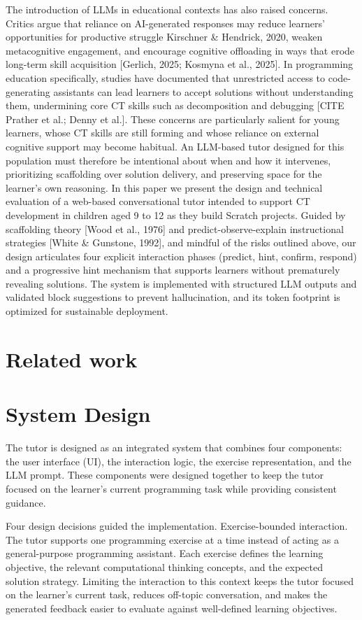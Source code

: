 \documentclass[conference]{IEEEtran}
\begin{document}
The introduction of LLMs in educational contexts has also raised concerns. Critics argue that reliance on AI-generated responses may reduce learners' opportunities for productive struggle Kirschner \& Hendrick, 2020, weaken metacognitive engagement, and encourage cognitive offloading in ways that erode long-term skill acquisition [Gerlich, 2025; Kosmyna et al., 2025]. In programming education specifically, studies have documented that unrestricted access to code-generating assistants can lead learners to accept solutions without understanding them, undermining core CT skills such as decomposition and debugging [CITE Prather et al.; Denny et al.]. These concerns are particularly salient for young learners, whose CT skills are still forming and whose reliance on external cognitive support may become habitual. An LLM-based tutor designed for this population must therefore be intentional about when and how it intervenes, prioritizing scaffolding over solution delivery, and preserving space for the learner's own reasoning.
In this paper we present the design and technical evaluation of a web-based conversational tutor intended to support CT development in children aged 9 to 12 as they build Scratch projects. Guided by scaffolding theory [Wood et al., 1976] and predict-observe-explain instructional strategies [White \& Gunstone, 1992], and mindful of the risks outlined above, our design articulates four explicit interaction phases (predict, hint, confirm, respond) and a progressive hint mechanism that supports learners without prematurely revealing solutions. The system is implemented with structured LLM outputs and validated block suggestions to prevent hallucination, and its token footprint is optimized for sustainable deployment.


\section{Related work}
\section{System Design}

The tutor is designed as an integrated system that combines four components: the user interface (UI), the interaction logic, the exercise representation, and the LLM prompt. These components were designed together to keep the tutor focused on the learner's current programming task while providing consistent guidance.

Four design decisions guided the implementation.
Exercise-bounded interaction. The tutor supports one programming exercise at a time instead of acting as a general-purpose programming assistant. Each exercise defines the learning objective, the relevant computational thinking concepts, and the expected solution strategy. Limiting the interaction to this context keeps the tutor focused on the learner's current task, reduces off-topic conversation, and makes the generated feedback easier to evaluate against well-defined learning objectives.
\end{document}
